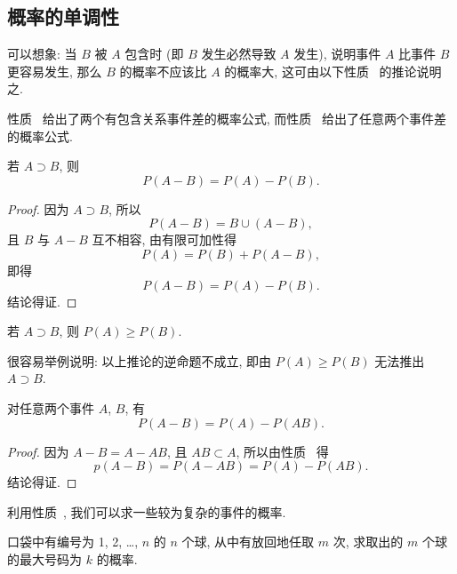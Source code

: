 \subsection{概率的单调性}

可以想象:
当 $B$ 被 $A$ 包含时 (即 $B$ 发生必然导致 $A$ 发生),
说明事件 $A$ 比事件 $B$ 更容易发生,
那么 $B$ 的概率不应该比 $A$ 的概率大,
这可由以下性质~\label{property1.3.4} 的推论说明之.

性质~\label{property1.3.4} 给出了两个有包含关系事件差的概率公式,
而性质~\label{property1.3.5} 给出了任意两个事件差的概率公式.

\begin{property}\label{property1.3.4}
  若 $A \supset B$,
  则
  \begin{equation}
    P (A - B) = P (A) - P (B).
    \label{eq1.3.3}
  \end{equation}
\end{property}

\begin{proof}
  因为 $A \supset B$,
  所以
  \[
    P (A - B) = B \cup (A - B),
  \]
  且 $B$ 与 $A - B$ 互不相容,
  由有限可加性得
  \[
    P (A) = P (B) + P (A - B),
  \]
  即得
  \[
    P (A - B) = P (A) - P (B).
  \]
  结论得证.
\end{proof}

\begin{corollary}{}
  若 $A \supset B$,
  则 $P (A) \ge P (B)$.
\end{corollary}

很容易举例说明:
以上推论的逆命题不成立,
即由 $P (A) \ge P (B)$ 无法推出 $A \supset B$.

\begin{property}\label{property1.3.5}
  对任意两个事件 $A$, $B$, 有
  \begin{equation}
    P (A - B) = P (A) - P (AB).
    \label{eq1.3.4}
  \end{equation}
\end{property}

\begin{proof}
  因为 $A - B = A - AB$,
  且 $AB \subset A$,
  所以由性质~\label{property1.3.4} 得
  \[
     p (A - B) = P (A - AB) = P (A) - P (AB).
  \]
  结论得证.
\end{proof}

利用性质~\label{property1.3.4},
我们可以求一些较为复杂的事件的概率.

\begin{example}
  口袋中有编号为 1, 2, \dots, $n$ 的 $n$ 个球,
  从中有放回地任取 $m$ 次,
  求取出的 $m$ 个球的最大号码为 $k$ 的概率.
\end{example}

